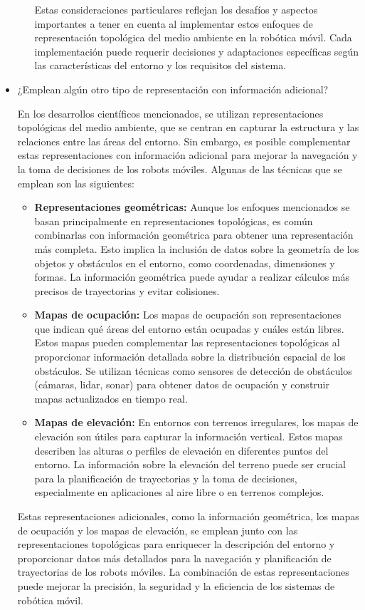 \documentclass{article}
\begin{document}
\begin{itemize}
\begin{enumerate}
    Estas consideraciones particulares reflejan los desafíos y aspectos importantes a tener en cuenta al implementar estos enfoques de representación topológica del medio ambiente en la robótica móvil. Cada implementación puede requerir decisiones y adaptaciones específicas según las características del entorno y los requisitos del sistema.
    
  \end{enumerate}
  
\item {¿Emplean algún otro tipo de representación con información adicional?}

  En los desarrollos científicos mencionados, se utilizan representaciones topológicas del medio ambiente, que se centran en capturar la estructura y las relaciones entre las áreas del entorno. Sin embargo, es posible complementar estas representaciones con información adicional para mejorar la navegación y la toma de decisiones de los robots móviles. Algunas de las técnicas que se emplean son las siguientes:

  \begin{itemize}
\item \textbf{Representaciones geométricas:} Aunque los enfoques mencionados se basan principalmente en representaciones topológicas, es común combinarlas con información geométrica para obtener una representación más completa. Esto implica la inclusión de datos sobre la geometría de los objetos y obstáculos en el entorno, como coordenadas, dimensiones y formas. La información geométrica puede ayudar a realizar cálculos más precisos de trayectorias y evitar colisiones.
\item \textbf{Mapas de ocupación:} Los mapas de ocupación son representaciones que indican qué áreas del entorno están ocupadas y cuáles están libres. Estos mapas pueden complementar las representaciones topológicas al proporcionar información detallada sobre la distribución espacial de los obstáculos. Se utilizan técnicas como sensores de detección de obstáculos (cámaras, lidar, sonar) para obtener datos de ocupación y construir mapas actualizados en tiempo real.
\item \textbf{Mapas de elevación:} En entornos con terrenos irregulares, los mapas de elevación son útiles para capturar la información vertical. Estos mapas describen las alturas o perfiles de elevación en diferentes puntos del entorno. La información sobre la elevación del terreno puede ser crucial para la planificación de trayectorias y la toma de decisiones, especialmente en aplicaciones al aire libre o en terrenos complejos.

  \end{itemize}

  Estas representaciones adicionales, como la información geométrica, los mapas de ocupación y los mapas de elevación, se emplean junto con las representaciones topológicas para enriquecer la descripción del entorno y proporcionar datos más detallados para la navegación y planificación de trayectorias de los robots móviles. La combinación de estas representaciones puede mejorar la precisión, la seguridad y la eficiencia de los sistemas de robótica móvil.

  
  \end{itemize}
\end{document}
